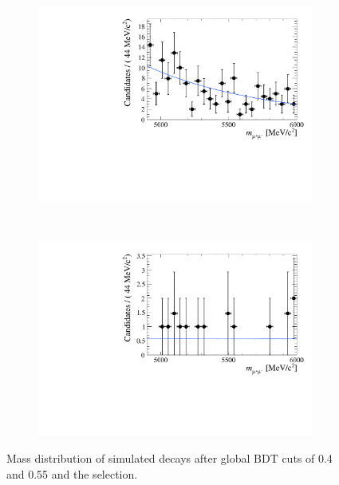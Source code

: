 \begin{figure}[htbp]
    \centering
    \begin{subfigure}[b]{0.7\textwidth}
        \includegraphics[width=\textwidth]{./Figs/Selection/BDT0p4.pdf}
    \end{subfigure}
    ~ %
    \begin{subfigure}[b]{0.7\textwidth}
       \includegraphics[width=\textwidth]{./Figs/Selection/BDT0p55.pdf}
    \end{subfigure}
    \caption{Mass distribution of \bbarmumux simulated decays after global BDT cuts of 0.4 and 0.55 and the \bsmumu selection.}
    \label{fig:BDTmasses}
\end{figure}



